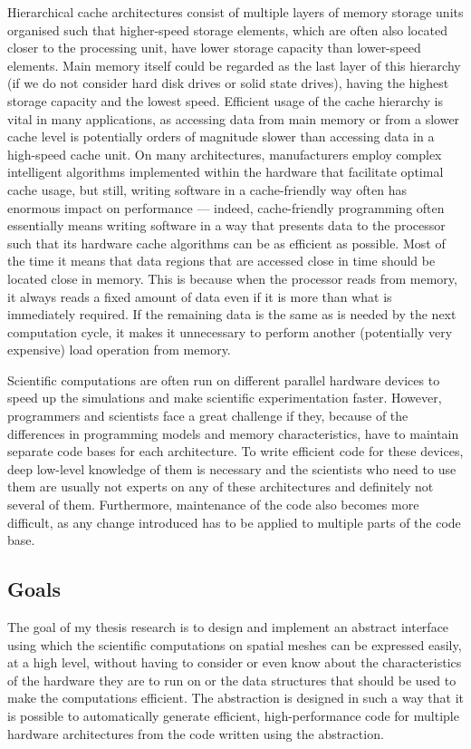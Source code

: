 \documentclass[fontsize=11pt, appendixprefix=true]{scrreprt}
\begin{document}
Hierarchical cache architectures consist of multiple layers of memory storage
units organised such that higher-speed storage elements, which are often also
located closer to the processing unit, have lower storage capacity than
lower-speed elements. Main memory itself could be regarded as the last layer of
this hierarchy (if we do not consider hard disk drives or solid state drives),
having the highest storage capacity and the lowest speed. Efficient usage of the
cache hierarchy is vital in many applications, as accessing data from main
memory or from a slower cache level is potentially orders of magnitude slower
than accessing data in a high-speed cache unit. On many architectures,
manufacturers employ complex intelligent algorithms implemented within the
hardware that facilitate optimal cache usage, but still, writing software in a
cache-friendly way often has enormous impact on performance --- indeed,
cache-friendly programming often essentially means writing software in a way
that presents data to the processor such that its hardware cache algorithms can
be as efficient as possible. Most of the time it means that data regions that
are accessed close in time should be located close in memory. This is because
when the processor reads from memory, it always reads a fixed amount of data
even if it is more than what is immediately required. If the remaining data is
the same as is needed by the next computation cycle, it makes it unnecessary to
perform another (potentially very expensive) load operation from memory.

Scientific computations are often run on different parallel hardware devices to
speed up the simulations and make scientific experimentation faster. However,
programmers and scientists face a great challenge if they, because of the
differences in programming models and memory characteristics, have to maintain
separate code bases for each architecture. To write efficient code for these
devices, deep low-level knowledge of them is necessary and the scientists who
need to use them are usually not experts on any of these architectures and
definitely not several of them. Furthermore, maintenance of the code also
becomes more difficult, as any change introduced has to be applied to multiple
parts of the code base.

\subsection{Goals}
\label{Goals}

The goal of my thesis research is to design and implement an abstract interface
using which the scientific computations on spatial meshes can be expressed
easily, at a high level, without having to consider or even know about the
characteristics of the hardware they are to run on or the data structures that
should be used to make the computations efficient. The abstraction is designed
in such a way that it is possible to automatically generate efficient,
high-performance code for multiple hardware architectures from the code written
using the abstraction.
\end{document}
